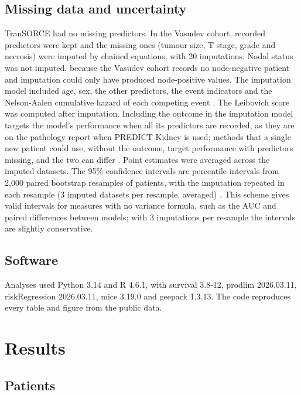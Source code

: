 \documentclass[11pt,a4paper]{article}
\begin{document}
\subsection*{Missing data and uncertainty}

TranSORCE had no missing predictors.
In the Vasudev cohort, recorded predictors were kept and the missing ones (tumour size, T stage, grade and necrosis) were imputed by chained equations, with 20 imputations.
Nodal status was not imputed, because the Vasudev cohort records no node-negative patient and imputation could only have produced node-positive values.
The imputation model included age, sex, the other predictors, the event indicators and the Nelson-Aalen cumulative hazard of each competing event \cite{Bonneville_2022}.
The Leibovich score was computed after imputation.
Including the outcome in the imputation model targets the model's performance when all its predictors are recorded, as they are on the pathology report when PREDICT Kidney is used; methods that a single new patient could use, without the outcome, target performance with predictors missing, and the two can differ \cite{Hoogland_2020}.
Point estimates were averaged across the imputed datasets.
The 95\% confidence intervals are percentile intervals from 2,000 paired bootstrap resamples of patients, with the imputation repeated in each resample (3 imputed datasets per resample, averaged) \cite{Bartlett_2020}.
This scheme gives valid intervals for measures with no variance formula, such as the AUC and paired differences between models; with 3 imputations per resample the intervals are slightly conservative.

\subsection*{Software}

Analyses used Python 3.14 and R 4.6.1, with survival 3.8-12, prodlim 2026.03.11, riskRegression 2026.03.11, mice 3.19.0 and geepack 1.3.13.
The code reproduces every table and figure from the public data.

\section*{Results}

\subsection*{Patients}
\end{document}
